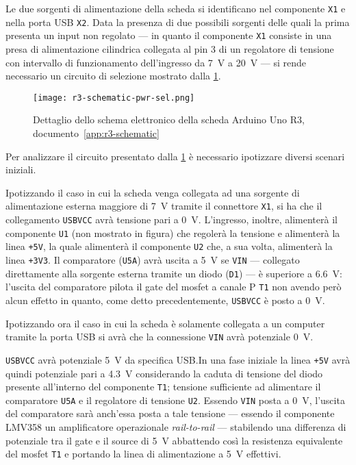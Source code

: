 Le due sorgenti di alimentazione della scheda si identificano nel componente \texttt{X1} e nella porta USB \texttt{X2}. Data la presenza di due possibili sorgenti delle quali la prima presenta un input non regolato --- in quanto il componente \texttt{X1} consiste in una presa di alimentazione cilindrica collegata al pin 3 di un regolatore di tensione con intervallo di funzionamento dell'ingresso da \SI{7}{\volt} a \SI{20}{\volt}\cite{onsemi:ncp111750} --- si rende necessario un circuito di selezione mostrato dalla \cref{fig:r3-schematic-pwr-sel-detail}.

\begin{figure}[t]
    \centering
    \texttt{[image: r3-schematic-pwr-sel.png]}
    \caption[Dettaglio dello schema elettronico posto in appendice, documento~\ref{app:r3-schematic}]{Dettaglio dello schema elettronico della scheda Arduino Uno R3, documento~\ref{app:r3-schematic}~\cite{site:r3-schematic}}\label{fig:r3-schematic-pwr-sel-detail}
\end{figure}

Per analizzare il circuito presentato dalla \cref{fig:r3-schematic-pwr-sel-detail} è necessario ipotizzare diversi scenari iniziali.

Ipotizzando il caso in cui la scheda venga collegata ad una sorgente di alimentazione esterna maggiore di \SI{7}{\volt} tramite il connettore \texttt{X1}, si ha che il collegamento \texttt{USBVCC} avrà tensione pari a \SI{0}{\volt}.
L'ingresso, inoltre, alimenterà il componente \texttt{U1} (non mostrato in figura) che regolerà la tensione e alimenterà la linea \texttt{+5V}, la quale alimenterà il componente \texttt{U2} che, a sua volta, alimenterà la linea \texttt{+3V3}.
Il comparatore (\texttt{U5A}) avrà uscita a \SI{5}{\volt} se \texttt{VIN} --- collegato direttamente alla sorgente esterna tramite un diodo (\texttt{D1}) --- è superiore a \SI{6.6}{\volt}: l'uscita del comparatore pilota il gate del mosfet a canale P \texttt{T1} non avendo però alcun effetto in quanto, come detto precedentemente, \texttt{USBVCC} è posto a \SI{0}{\volt}.

Ipotizzando ora il caso in cui la scheda è solamente collegata a un computer tramite la porta USB si avrà che la connessione \texttt{VIN} avrà potenziale \SI{0}{\volt}.

\texttt{USBVCC} avrà potenziale \SI{5}{\volt} da specifica USB\cite{usb2.0specs}.\@ In una fase iniziale la linea \texttt{+5V} avrà quindi potenziale pari a \SI{4.3}{\volt} considerando la caduta di tensione del diodo presente all'interno del componente \texttt{T1}; tensione sufficiente ad alimentare il comparatore \texttt{U5A} e il regolatore di tensione \texttt{U2}.
Essendo \texttt{VIN} posta a \SI{0}{\volt}, l'uscita del comparatore sarà anch'essa posta a tale tensione --- essendo il componente LMV358 un amplificatore operazionale \textit{rail-to-rail}\cite{ti:lmv358} --- stabilendo una differenza di potenziale tra il gate e il source di \SI{5}{\volt} abbattendo così la resistenza equivalente del mosfet \texttt{T1} e portando la linea di alimentazione a \SI{5}{\volt} effettivi\cite{onsemi:fdn340p}.

